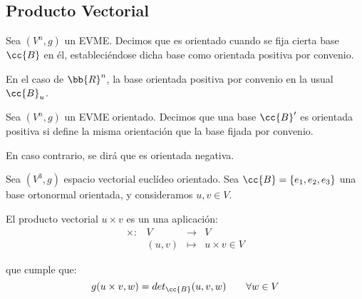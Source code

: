 \subsection{Producto Vectorial}

\begin{definicion} Sea $(V^n,g)$ un EVME. Decimos que es orientado cuando se fija cierta base $\cc{B}$ en él, estableciéndose dicha base como orientada positiva por convenio.

En el caso de $\bb{R}^n$, la base orientada positiva por convenio en la usual $\cc{B}_u$.
\end{definicion}



\begin{definicion}
    Sea $(V^n,g)$ un EVME orientado. Decimos que una base $\cc{B}'$ es orientada positiva si define la misma orientación que la base fijada por convenio.

    En caso contrario, se dirá que es orientada negativa.
\end{definicion}


\begin{definicion}
    Sea $(V^3, g)$ espacio vectorial euclídeo orientado. Sea $\cc{B}=\{e_1, e_2, e_3\}$ una base ortonormal orientada, y consideramos $u,v\in V$.
    
    El producto vectorial $u\times v$ es un una aplicación:
    \begin{equation*}
        \begin{array}{cccc}
            \times : & V & \longrightarrow & V \\
            & (u,v) & \longmapsto & u\times v \in V
        \end{array}
    \end{equation*}
    
    que cumple que:
    \begin{equation*}
        g(u\times v, w)=det_{\cc{B}} (u,v,w)\qquad \forall w\in V
    \end{equation*}
\end{definicion}

